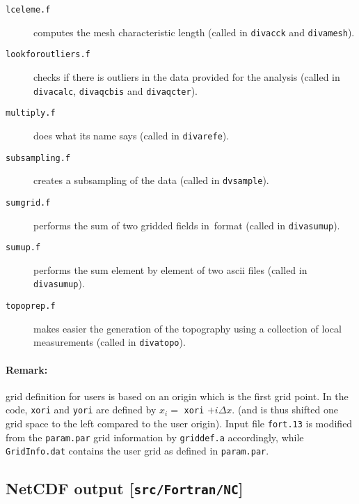 \begin{description}

\item[\texttt{lceleme.f}] computes the mesh characteristic length (called in \texttt{divacck} and \texttt{divamesh}).

\item[\texttt{lookforoutliers.f}] checks if there is outliers in the data provided for the analysis (called in \texttt{divacalc}, \texttt{divaqcbis} and \texttt{divaqcter}).

\item[\texttt{multiply.f}] does what its name says (called in \texttt{divarefe}).

\item[\texttt{subsampling.f}] creates a subsampling of the data (called in \texttt{dvsample}).

\item[\texttt{sumgrid.f}] performs the sum of two gridded fields in \gher\,format (called in \texttt{divasumup}).

\item[\texttt{sumup.f}] performs the sum element by element of two ascii files (called in \texttt{divasumup}).

\item[\texttt{topoprep.f}] makes easier the generation of the topography using a collection of local measurements (called in \texttt{divatopo}).

\end{description}

\paragraph{Remark:} grid definition for users is based on an origin which is the first grid point. 
In the code, \texttt{xori} and \texttt{yori} are defined by $x_i=$ \texttt{xori} $+i \Delta x$.
(and is thus shifted one grid space to the left compared to the user origin). Input file \texttt{fort.13} is modified from the \texttt{param.par} grid information by \texttt{griddef.a} accordingly, while \texttt{GridInfo.dat} contains the user grid as defined in \texttt{param.par}.


\subsection[NetCDF output]{NetCDF output [\texttt{src/Fortran/NC}]}

